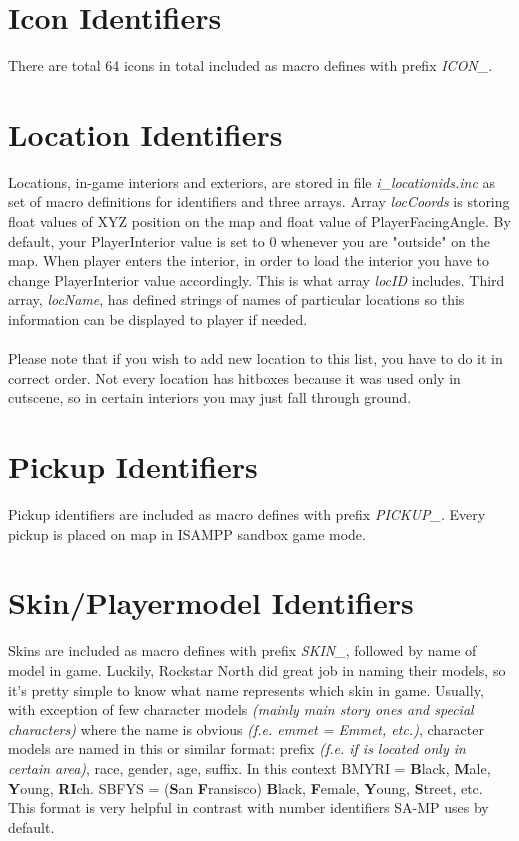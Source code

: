 \documentclass{article}
\begin{document}
\section{Icon Identifiers}
There are total 64 icons in total included as macro defines with prefix \textit{ICON\_}. 


\section{Location Identifiers}
Locations, in-game interiors and exteriors, are stored in file \textit{i\_locationids.inc} as set of macro definitions for identifiers and three arrays. Array \textit{locCoords} is storing float values of XYZ position on the map and float value of PlayerFacingAngle. By default, your PlayerInterior value is set to 0 whenever you are "outside" on the map. When player enters the interior, in order to load the interior you have to change PlayerInterior value accordingly. This is what array \textit{locID} includes. Third array, \textit{locName}, has defined strings of names of particular locations so this information can be displayed to player if needed.\\
\\
Please note that if you wish to add new location to this list, you have to do it in correct order. Not every location has hitboxes because it was used only in cutscene, so in certain interiors you may just fall through ground.

\section{Pickup Identifiers}
Pickup identifiers are included as macro defines with prefix \textit{PICKUP\_}. Every pickup is placed on map in ISAMPP sandbox game mode.

\section{Skin/Playermodel Identifiers}
Skins are included as macro defines with prefix \textit{SKIN\_}, followed by name of model in game. Luckily, Rockstar North did great job in naming their models, so it's pretty simple to know what name represents which skin in game. Usually, with exception of few character models \textit{(mainly main story ones and special characters)} where the name is obvious \textit{(f.e. emmet = Emmet, etc.)}, character models are named in this or similar format: prefix \textit{(f.e. if is located only in certain area)}, race, gender, age, suffix. In this context BMYRI = \textbf{B}lack, \textbf{M}ale, \textbf{Y}oung, \textbf{RI}ch. SBFYS = (\textbf{S}an \textbf{F}ransisco) \textbf{B}lack, \textbf{F}emale, \textbf{Y}oung, \textbf{S}treet, etc. This format is very helpful in contrast with number identifiers SA-MP uses by default.
\end{document}
